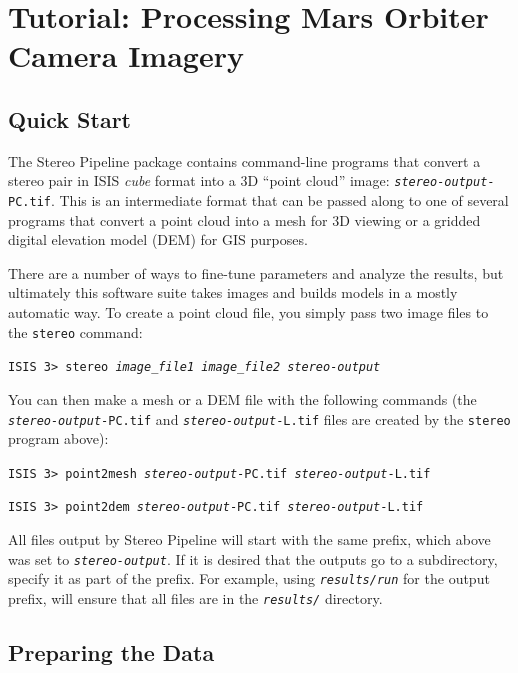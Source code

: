\chapter{Tutorial: Processing Mars Orbiter Camera Imagery}
\label{ch:tutorial}


\section{Quick Start}

The Stereo Pipeline package contains command-line programs that
convert a stereo pair in ISIS {\em cube} format into a 3D ``point
cloud'' image: \texttt{\textit{stereo-output}-PC.tif}.  This is an
intermediate format that can be passed along to one of several
programs that convert a point cloud into a mesh for 3D viewing or a
gridded digital elevation model (DEM) for GIS purposes.

There are a number of ways to fine-tune parameters and analyze the
results, but ultimately this software suite takes images and builds
models in a mostly automatic way.  To create a point cloud file, you
simply pass two image files to the \texttt{stereo} command:

\hspace*{2em}\texttt{ISIS 3> stereo \textit{image\_file1 image\_file2 stereo-output}}
\smallskip

You can then make a mesh or a \ac{DEM} file with the following
commands (the \texttt{\textit{stereo-output}-PC.tif} and
\texttt{\textit{stereo-output}-L.tif} files are created by the
\texttt{stereo} program above):

\hspace*{2em}\texttt{ISIS 3> point2mesh \textit{stereo-output}-PC.tif \textit{stereo-output}-L.tif}
\smallskip

\hspace*{2em}\texttt{ISIS 3> point2dem \textit{stereo-output}-PC.tif \textit{stereo-output}-L.tif}
\smallskip

All files output by Stereo Pipeline will start with the same prefix,
which above was set to \texttt{\textit{stereo-output}}. If it is desired
that the outputs go to a subdirectory, specify it as part of the
prefix. For example, using \texttt{\textit{results/run}} for the output
prefix, will ensure that all files are in the \texttt{\textit{results/}} directory.

\section{Preparing the Data}

